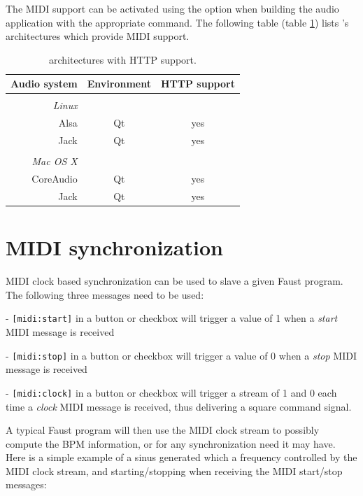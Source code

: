 The MIDI support can be activated using the  option when building the audio application with the appropriate  command. The following table (table \ref{tab:midiarch}) lists \faust's architectures which provide MIDI support. 

\begin{table}[htp]
\begin{center}
\begin{tabular}{rcc}
\hline
\bf{Audio system} 	& \bf{Environment} & \bf{HTTP support}	\\
\hline
\\
\emph{Linux}\\
Alsa  		& Qt		& yes\\
Jack 			& Qt		& yes\\
\\
\emph{Mac OS X} \\
CoreAudio 	& Qt 	 & yes\\
Jack 			& Qt  & yes\\
\hline
\end{tabular}
\end{center}
\caption{\faust architectures with HTTP support.}
\label{tab:midiarch}
\end{table}

\section{MIDI synchronization}

MIDI clock based synchronization can be used to slave a given Faust program. The following three messages need to be used:

- \lstinline'[midi:start]' in a button or checkbox will trigger a value of 1 when a \emph{start} MIDI message is received

- \lstinline'[midi:stop]' in a button or checkbox will trigger a value of 0 when a \emph{stop} MIDI message is received

- \lstinline'[midi:clock]' in a button or checkbox will trigger a stream of 1 and 0 each time a \emph{clock} MIDI message is received, thus delivering a square command signal.

A typical Faust program will then use the MIDI clock stream to possibly compute the BPM information, or for any synchronization need it may have.  Here is a simple example of a sinus generated which a frequency controlled by the MIDI clock stream, and starting/stopping when receiving the MIDI start/stop messages:

